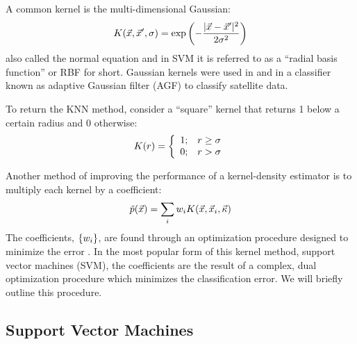 \documentclass{article}
\newenvironment{eqnnon}{\begin{equation}}{\end{equation}}
\begin{document}
A common kernel is the multi-dimensional Gaussian:
\begin{equation}
	K(\vec {x}, \vec {x}^\prime, \sigma) = \exp \left ( - \frac{|\vec {x} - \vec {x}^\prime|^2}{2 \sigma^2} \right )
	\label{Gaussian_kernel}
\end{equation}
also called the normal equation and in SVM it is referred to as a
``radial basis function'' or RBF for short.
Gaussian kernels were used in \citet{Mills2009} and \citet{Mills2011} in a
classifier known as adaptive Gaussian filter (AGF)
to classify satellite data.

To return the KNN method, consider a ``square'' kernel that returns 1 below
a certain radius and 0 otherwise:
\begin{equation}
	K(r) = \left \lbrace
	\begin{array}{lr}
		1; & r \ge \sigma \\
		0; & r > \sigma
	\end{array} \right .
\end{equation}

Another method of improving the performance of a kernel-density estimator
is to multiply each kernel by a coefficient:
\begin{eqnnon}
	\densityestimator(\testpoint) = \sum_i \svmcoeff_i \vectorkernel(\testpoint, \sample_i, \kernelparam)
	\label{weighted_kernel_estimator}
\end{eqnnon}
The coefficients, $\lbrace w_i \rbrace$, are found through an optimization
procedure designed to minimize the error \citep{Chen_etal2015}. In the most popular
form of this kernel method, support vector machines (SVM), the coefficients
are the result of a complex, dual optimization procedure which minimizes
the classification error. We will briefly outline this procedure.

\subsection{Support Vector Machines}
\end{document}

